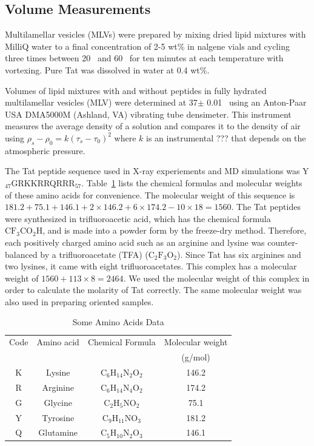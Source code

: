 \subsection{Volume Measurements}\label{sec:volume_method}
Multilamellar vesicles (MLVs) were prepared by mixing dried lipid mixtures with 
MilliQ water to a final concentration of 2-5 wt\% in nalgene vials and cycling 
three times between 20 \textcelsius\ and 60 \textcelsius\ for ten minutes at 
each temperature with vortexing. Pure Tat was dissolved in water at 0.4 wt\%.

Volumes of lipid mixtures with and without peptides in fully hydrated 
multilamellar vesicles (MLV) were determined at 37$\pm$ 0.01 \textcelsius\ 
using an Anton-Paar USA DMA5000M (Ashland, VA) vibrating tube densimeter. 
This instrument measures the average density of a solution and compares it to
the density of air using $\rho_s-\rho_0=k(\tau_s-\tau_0)^2$ where $k$ is
an instrumental ??? that depends on the atmospheric pressure. 

The Tat peptide sequence used in X-ray experiements and MD simulations was 
Y$_{47}$GRKKRRQRRR$_{57}$. Table~\ref{tb:aa} lists the chemical formulas and 
molecular weights of these amino acids for convenience. The molecular weight of 
this sequence is 
$181.2+75.1+146.1+2 \times 146.2+6\times 174.2-10\times 18=1560$.
The Tat peptides were synthesized in trifluoroacetic acid, which has 
the chemical formula $\mathrm{CF_3CO_2H}$, and is made into a powder form by the 
freeze-dry method. Therefore, each positively charged amino acid such as 
an arginine and lysine was counter-balanced by a trifluoroacetate (TFA)
($\mathrm{C_2F_3O_2}$). Since Tat has six arginines and two lysines, it came 
with eight trifluoroacetates. This complex has a molecular weight of 
$1560+113\times 8=2464$. We used the 
molecular weight of this complex in order to calculate the molarity of Tat
correctly. The same molecular weight was also used in preparing oriented 
samples.

\begin{table}[htbp]
  \centering
  \begin{tabular}{c c c c}
    \hline
    Code & Amino acid & Chemical Formula & Molecular weight \\
    & & & (g/mol) \\
    \hline
    K & Lysine & $\mathrm{C_6H_{14}N_2O_2}$ & 146.2 \\
    R & Arginine & $\mathrm{C_6H_{14}N_4O_2}$ & 174.2 \\
    G & Glycine & $\mathrm{C_2H_5NO_2}$ & 75.1\\
    Y & Tyrosine & $\mathrm{C_9H_{11}NO_3}$ & 181.2 \\
    Q & Glutamine & $\mathrm{C_5H_{10}N_2O_3}$ & 146.1 \\ 
    \hline
  \end{tabular}
  \caption{Some Amino Acids Data}
  \label{tb:aa}
\end{table}

